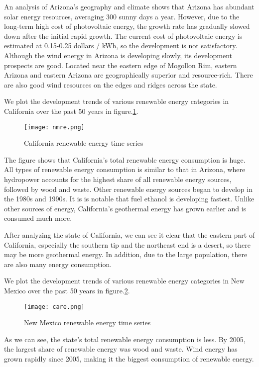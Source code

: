 \documentclass{mcmthesis}
\begin{document}
An analysis of Arizona's geography and climate shows that Arizona has abundant solar energy resources, averaging 300 sunny days a year. However, due to the long-term high cost of photovoltaic energy, the growth rate has gradually slowed down after the initial rapid growth. The current cost of photovoltaic energy is estimated at 0.15-0.25 dollars / kWh, so the development is not satisfactory.\cite{AZretime}
Although the wind energy in Arizona is developing slowly, its development prospects are good. Located near the eastern edge of Mogollon Rim, eastern Arizona and eastern Arizona are geographically superior and resource-rich. There are also good wind resources on the edges and ridges across the state.\cite{AZwind}

We plot the development trends of various renewable energy categories in California over the past 50 years in figure.\ref{fig: California renewable energy time series}.
\begin{figure}[htb]
  \centering
  \texttt{[image: nmre.png]}
  \caption{California renewable energy time series} \label{fig: California renewable energy time series}
\end{figure}

The figure shows that California's total renewable energy consumption is huge. All types of renewable energy consumption is similar to that in Arizona, where hydropower accounts for the highest share of all renewable energy sources, followed by wood and waste. Other renewable energy sources began to develop in the 1980s and 1990s. It is is notable that fuel ethanol is developing fastest. Unlike other sources of energy, California's geothermal energy has grown earlier and is consumed much more.

After analyzing the state of California, we can see it clear that the eastern part of California, especially the southern tip and the northeast end is a desert, so there may be more geothermal energy. In addition, due to the large population, there are also many energy consumption.

We plot the development trends of various renewable energy categories in New Mexico over the past 50 years in figure.\ref{fig: New Mexico renewable energy time series}.
\begin{figure}[htb]
  \centering
  \texttt{[image: care.png]}
  \caption{New Mexico renewable energy time series} \label{fig: New Mexico renewable energy time series}
\end{figure}

As we can see, the state's total renewable energy consumption is less. By 2005, the largest share of renewable energy was wood and waste. Wind energy has grown rapidly since 2005, making it the biggest consumption of renewable energy.
\end{document}
